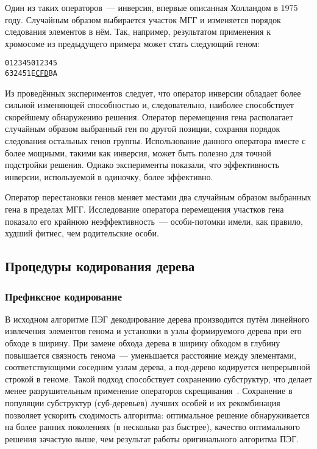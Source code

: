 Один из таких операторов~--- инверсия, впервые описанная Холландом в 1975 году. Случайным образом выбирается участок МГГ и изменяется порядок следования элементов в нём. Так, например, результатом применения к хромосоме из предыдущего примера может стать следующий геном:

\begin{samepage}
\begin{alltt}
012345 012345
632451 E{\underline{CFD}}BA
\end{alltt}
\end{samepage}

Из проведённых экспериментов следует, что оператор инверсии обладает более сильной изменяющей способностью и, следовательно, наиболее способствует скорейшему обнаружению решения.
Оператор перемещения гена располагает случайным образом выбранный ген по другой позиции, сохраняя порядок следования остальных генов группы. Использование данного оператора вместе с более мощными, такими как инверсия, может быть полезно для точной подстройки решения. Однако эксперименты показали, что эффективность инверсии, используемой в одиночку, более эффективно.

Оператор перестановки генов меняет местами два случайным образом выбранных гена в пределах МГГ. Исследование оператора перемещения участков гена показало его крайнюю неэффективность~--- особи-потомки имели, как правило, худший фитнес, чем родительские особи.


\subsection{Процедуры кодирования дерева}

\subsubsection{Префиксное кодирование}

В исходном алгоритме ПЭГ декодирование дерева производится путём линейного извлечения элементов генома и установки в узлы формируемого дерева при его обходе в ширину. При замене обхода дерева в ширину обходом в глубину повышается связность генома~--- уменьшается расстояние между элементами, соответствующими соседним узлам дерева, а под-дерево кодируется непрерывной строкой в геноме. Такой подход способствует сохранению субструктур, что делает менее разрушительным применение операторов скрещивания~\cite{Li:gecco05lbp}. Сохранение в популяции субструктур (суб-деревьев) лучших особей и их рекомбинация позволяет ускорить сходимость алгоритма: оптимальное решение обнаруживается на более ранних поколениях (в несколько раз быстрее), качество оптимального решения зачастую выше, чем результат работы оригинального алгоритма ПЭГ.

